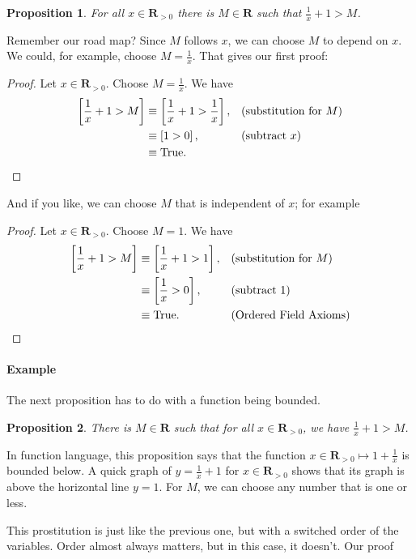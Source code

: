\documentclass[12pt,fleqn]{article}
\newcommand{\reals}{\mathbf{R}}
\newcommand{\true}{\mathrm{True}}
\newenvironment{myproof}
  {\begin{shaded}\begin{proof}}
  {\end{proof}\end{shaded}}
\newtheorem{prop}{Proposition}
\newcounter{ex}\setcounter{ex}{0}
\newcommand{\ex}{%
\setcounter{ex}{\value{ex}+1}
\paragraph{Example \theex}}
\begin{document}
    \begin{prop} For all $x \in \reals_{>0}$ there is $M \in \reals$ such
     that $\frac{1}{x} +1 > M$. 
    \end{prop}
    Remember our road map? Since $M$ follows $x$, we can choose $M$ to depend on $x$. We could, for example, 
    choose $M = \frac{1}{x}$. That gives our first proof:
         \begin{myproof} 
      Let $x \in \reals_{>0}$. Choose $M = \frac{1}{x}$. We have
          \begin{align*}
          \left[\frac{1}{x}+1>M \right] &\equiv \left[\frac{1}{x}+1> \frac{1}{x} \right], &&\text{(substitution for $M$)} \\
                                  &\equiv \left [1 >0 \right], && \text{(subtract $x$)} \\
                                  &\equiv \true.   \qedhere
      \end{align*}
\end{myproof}
And if you like, we can choose $M$ that is independent of $x$; for example    
    \begin{myproof} 
      Let $x \in \reals_{>0}$. Choose $M = 1$. We have
          \begin{align*}
          \left[\frac{1}{x}+1>M \right] &\equiv \left[\frac{1}{x}+1>1\right], &&\text{(substitution for $M$)} \\
                                  &\equiv \left [\frac{1}{x}>0 \right],
                                  &&\text {(subtract 1)} \\
                                  &\equiv \true. &&\text {(Ordered Field Axioms)} \qedhere
      \end{align*}
\end{myproof}

\ex The next proposition has to do with a function being bounded.
    \begin{prop}
      There is $M \in \reals$ such that for all $x \in \reals_{>0}$,
     we have $\frac{1}{x} + 1 > M$. 
    \end{prop}
    In function language, this proposition  says that the function $x \in \reals_{>0} \mapsto 1+\frac{1}{x}$ is bounded below.
        A quick graph of $ y = \frac{1}{x} + 1 $ for  $x \in \reals_{>0}$ shows that its graph is above the horizontal line $y = 1$. For $M$, 
    we can choose any number that is one or less.
    
    This prostitution is just like the previous one, but with a switched order of the variables.  Order almost always matters, but in this case, it 
    doesn't. Our proof
    
\end{document}
